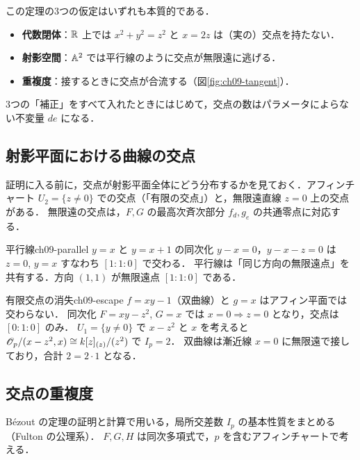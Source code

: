 この定理の3つの仮定はいずれも本質的である．
\begin{itemize}
  \item \textbf{代数閉体}：$\mathbb{R}$ 上では $x^2+y^2=z^2$ と $x=2z$ は（実の）交点を持たない．
  \item \textbf{射影空間}：$\mathbb{A}^2$ では平行線のように交点が無限遠に逃げる．
  \item \textbf{重複度}：接するときに交点が合流する（図\ref{fig:ch09-tangent}）．
\end{itemize}
3つの「補正」をすべて入れたときにはじめて，交点の数はパラメータによらない不変量 $de$ になる．

\subsection{射影平面における曲線の交点}

証明に入る前に，交点が射影平面全体にどう分布するかを見ておく．アフィンチャート $U_2=\{z\neq0\}$ での交点（「有限の交点」）と，無限遠直線 $z=0$ 上の交点がある．
無限遠の交点は，$F,G$ の最高次斉次部分 $f_d,g_e$ の共通零点に対応する．

\begin{myex}{平行線}{ch09-parallel}
$y=x$ と $y=x+1$ の同次化 $y-x=0$，$y-x-z=0$ は $z=0$, $y=x$ すなわち $[1:1:0]$ で交わる．
平行線は「同じ方向の無限遠点」を共有する．方向 $(1,1)$ が無限遠点 $[1:1:0]$ である．
\end{myex}

\begin{myex}{有限交点の消失}{ch09-escape}
$f=xy-1$（双曲線）と $g=x$ はアフィン平面では交わらない．
同次化 $F=xy-z^2$, $G=x$ では $x=0\Rightarrow z=0$ となり，交点は $[0:1:0]$ のみ．
$U_1=\{y\neq0\}$ で $x-z^2$ と $x$ を考えると $\mathscr{O}_p/(x-z^2,x)\cong k[z]_{(z)}/(z^2)$ で $I_p=2$．
双曲線は漸近線 $x=0$ に無限遠で接しており，合計 $2=2\cdot1$ となる．
\end{myex}

\subsection{交点の重複度}

B\'ezout の定理の証明と計算で用いる，局所交差数 $I_p$ の基本性質をまとめる（Fulton の公理系）．
$F,G,H$ は同次多項式で，$p$ を含むアフィンチャートで考える．

